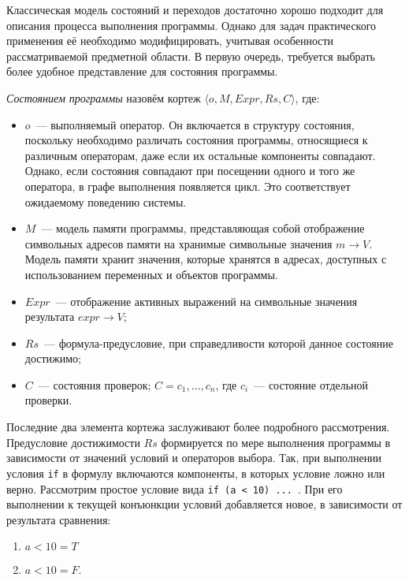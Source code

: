 Классическая модель состояний и переходов достаточно хорошо подходит для описания процесса выполнения программы. Однако для задач практического применения её необходимо модифицировать, учитывая особенности рассматриваемой предметной области. В первую очередь, требуется выбрать более удобное представление для состояния программы.

\textit{Состоянием программы} назовём кортеж $\langle o, M, Expr, Rs, C \rangle$, где:
\begin{itemize}
 \item $o$~--- выполняемый оператор. Он включается в структуру состояния, поскольку необходимо различать состояния программы, относящиеся к различным операторам, даже если их остальные компоненты совпадают. Однако, если состояния совпадают при посещении одного и того же оператора, в графе выполнения появляется цикл. Это соответствует ожидаемому поведению системы.
 \item $M$~--- модель памяти программы, представляющая собой отображение символьных адресов памяти на хранимые символьные значения $m \rightarrow V$. Модель памяти хранит значения, которые хранятся в адресах, доступных с использованием переменных и объектов программы.
 \item $Expr$~--- отображение активных выражений на символьные значения результата $expr \rightarrow V$;
 \item $Rs$~--- формула-предусловие, при справедливости которой данное состояние достижимо;
 \item $C$~--- состояния проверок; $C = c_1, \ldots, c_n$, где $c_i$~--- состояние отдельной проверки.
\end{itemize}

Последние два элемента кортежа заслуживают более подробного рассмотрения. Предусловие достижимости $Rs$ формируется по мере выполнения программы в зависимости от значений условий и операторов выбора. Так, при выполнении условия \texttt{if} в формулу включаются компоненты, в которых условие ложно или верно. Рассмотрим простое условие вида \texttt{if (a < 10) ... }. При его выполнении к текущей конъюнкции условий добавляется новое, в зависимости от результата сравнения:
\begin{enumerate}
 \item $a < 10 = T$
 \item $a < 10 = F$.
\end{enumerate}

